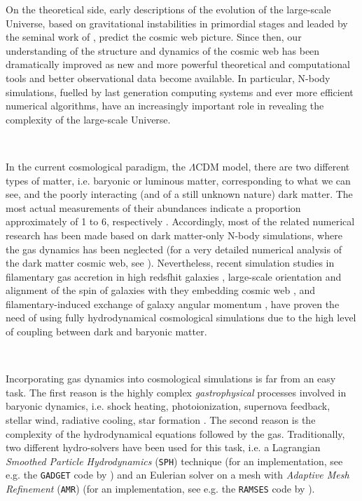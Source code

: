\documentclass[a4,useAMS,usenatbib,usegraphicx,12pt]{article}
\begin{document}
On the theoretical side, early descriptions of the evolution of the large-scale
Universe, based on gravitational instabilities in primordial stages and leaded 
by the seminal work of \citet{Zeldovich70}, predict the cosmic web picture. 
Since then, our understanding of the structure and dynamics of the cosmic web 
has been dramatically improved as new and more powerful theoretical and 
computational tools and better observational data become available. In 
particular, N-body simulations, fuelled by last generation computing systems 
and ever more efficient numerical algorithms, have an increasingly important 
role in revealing the complexity of the large-scale Universe.

\

In the current cosmological paradigm, the $\Lambda$CDM model, there are two 
different types of matter, i.e. baryonic or luminous matter, corresponding 
to what we can see, and the poorly interacting (and of a still unknown nature) 
dark matter. The most actual measurements of their abundances indicate a 
proportion approximately of 1 to 6, respectively \citep{Planck13XVI}. 
Accordingly, most of the related numerical research has been made based on 
dark matter-only N-body simulations, where the gas dynamics has been 
neglected (for a very detailed numerical analysis of the dark matter cosmic 
web, see \citet{Cautun14}). Nevertheless, recent simulation studies in 
filamentary gas accretion in high redsfhit galaxies \citep{Dekel09}, 
large-scale orientation and alignment of the spin of galaxies with they 
embedding cosmic web \citep{Hahn10}, and filamentary-induced exchange of 
galaxy angular momentum \citep{Dubois14}, have proven the need of using 
fully hydrodynamical cosmological simulations due to the high level of coupling
between dark and baryonic matter.

\

Incorporating gas dynamics into cosmological simulations is far from an easy 
task. The first reason is the highly complex \textit{gastrophysical} processes 
involved in baryonic dynamics, i.e. shock heating, photoionization, supernova 
feedback, stellar wind, radiative cooling, star formation \citep{Bond93}. The
second reason is the complexity of the hydrodynamical equations followed by 
the gas. Traditionally, two different hydro-solvers have been used for this 
task, i.e. a Lagrangian \textit{Smoothed Particle Hydrodynamics} (\texttt{SPH}) 
technique \citep{Monaghan92} (for an implementation, see e.g. the \texttt{GADGET} 
code by \citet{Springel05}) and an Eulerian solver on a mesh with \textit{
Adaptive Mesh Refinement} (\texttt{AMR}) \citep{Berger89} (for an implementation, 
see e.g. the \texttt{RAMSES} code by \citet{Teyssier02}). 
\end{document}
